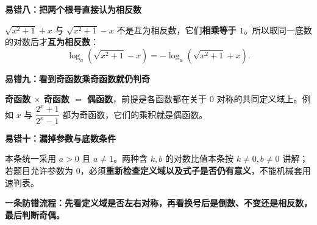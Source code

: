 \clearpage
\begin{trapbox}
\textbf{\textcolor{CTrap}{易错八：把两个根号直接认为相反数}}


$\sqrt{x^2+1}+x$ 与 $\sqrt{x^2+1}-x$ 不是互为相反数，它们\textbf{相乘等于 $1$}。所以取同一底数的对数后才\textbf{互为相反数}：
\[
 \log_a(\sqrt{x^2+1}-x)=-\log_a(\sqrt{x^2+1}+x).
\]
\end{trapbox}
\clearpage
\begin{trapbox}
\textbf{\textcolor{CTrap}{易错九：看到奇函数乘奇函数就仍判奇}}

\textbf{奇函数 $\times$ 奇函数 $=$ 偶函数}，前提是各函数都在关于 $0$ 对称的共同定义域上。例如 $x$ 与 $\dfrac{2^x+1}{2^x-1}$ 都为奇函数，它们的乘积就是偶函数。

\textbf{\textcolor{CTrap}{易错十：漏掉参数与底数条件}}

本条统一采用 $a>0$ 且 $a\ne1$。两种含 $k,b$ 的对数比值本条按 $k\ne0,b\ne0$ 讲解；若题目允许参数为 $0$，必须\textbf{重新检查定义域以及式子是否仍有意义}，不能机械套用速判表。

\textbf{一条防错流程：}\textbf{先看定义域是否左右对称，再看换号后是倒数、不变还是相反数，最后判断奇偶。}
\end{trapbox}
